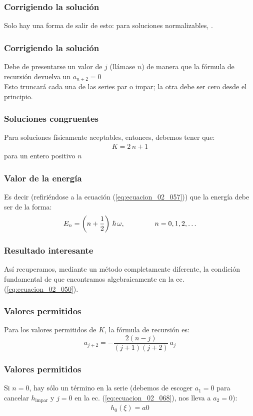 \documentclass[12pt]{beamer}
\begin{document}
\begin{frame}
\frametitle{Corrigiendo la solución}
Solo hay una forma de salir de esto: \pause para soluciones normalizables, . 
\end{frame}
\begin{frame}
\frametitle{Corrigiendo la solución}
Debe de presentarse un valor  de $j$ (llámase $n$) \pause de manera que la fórmula de recursión devuelva un $a_{n+2} = 0$ 
\\
\bigskip
\pause
Esto truncará cada una de las series par o impar; la otra debe ser cero desde el principio.
\end{frame}
\begin{frame}
\frametitle{Soluciones congruentes}
Para soluciones físicamente aceptables, entonces, debemos tener que:
\pause
\begin{align*}
K = 2 \, n + 1
\end{align*}
para un entero positivo $n$
\end{frame}
\begin{frame}
\frametitle{Valor de la energía}
Es decir (refiriéndose a la ecuación (\ref{eq:ecuacion_02_057})) que la energía debe ser de la forma:
\pause
\begin{equation}
E_{n} = \left( n + \dfrac{1}{2} \right) \, \hbar \, \omega , \hspace{1.5cm} n = 0, 1, 2, \ldots
\label{eq:ecuacion_02_067}
\end{equation}
\end{frame}
\begin{frame}
\frametitle{Resultado interesante}
Así recuperamos, mediante un método completamente diferente, \pause la condición fundamental de  que encontramos algebraicamente en la ec. (\ref{eq:ecuacion_02_050}).
\end{frame}
\begin{frame}
\frametitle{Valores permitidos}
Para los valores permitidos de $K$, la fórmula de recursión es:
\pause
\begin{equation}
a_{j+2} = - \dfrac{2 (n - j)}{(j + 1)(j + 2)} \, a_{j}
\label{eq:ecuacion_02_068}
\end{equation}
\end{frame}
\begin{frame}
\frametitle{Valores permitidos}
Si $n = 0$, \pause hay sólo un término en la serie (debemos de escoger $a_{1} = 0$ para cancelar $h_{\text{impar}}$ y $j=0$ en la ec. (\ref{eq:ecuacion_02_068}), nos lleva a $a_{2}=0$):
\pause
\begin{align*}
h_{0} (\xi) = a{0}
\end{align*}
\end{frame}
\end{document}
